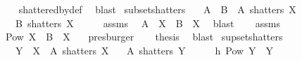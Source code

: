 \begin{isabellebody}
%
\isadelimproof
\ \ %
\endisadelimproof
%
\isatagproof
{}\isamarkupfalse%
\ shattered{\isacharunderscore}{\kern0pt}by{\isacharunderscore}{\kern0pt}def\ \isamarkupfalse%
\ blast%
\endisatagproof
{\isafoldproof}%
%
\isadelimproof
\isanewline
%
\endisadelimproof
\isanewline
{}\isamarkupfalse%
\ subset{\isacharunderscore}{\kern0pt}shatters{\isacharcolon}{\kern0pt}\isanewline
\ \ \ {\isachardoublequoteopen}A\ {\isasymsubseteq}\ B{\isachardoublequoteclose}\ \ {\isachardoublequoteopen}A\ shatters\ X{\isachardoublequoteclose}\isanewline
\ \ \ {\isachardoublequoteopen}B\ shatters\ X{\isachardoublequoteclose}\isanewline
%
\isadelimproof
%
\endisadelimproof
%
\isatagproof
{}\isamarkupfalse%
\ {\isacharminus}{\kern0pt}\isanewline
\ \ \isamarkupfalse%
\ assms{\isacharparenleft}{\kern0pt}{}{\isacharparenright}{\kern0pt}\ \isamarkupfalse%
\ {\isachardoublequoteopen}A\ {\isasyminter}{\isacharasterisk}{\kern0pt}\ X\ {\isasymsubseteq}\ B\ {\isasyminter}{\isacharasterisk}{\kern0pt}\ X{\isachardoublequoteclose}\ \isamarkupfalse%
\ blast\isanewline
\ \ \isamarkupfalse%
\ assms{\isacharparenleft}{\kern0pt}{}{\isacharparenright}{\kern0pt}\ \isamarkupfalse%
\ {\isachardoublequoteopen}Pow\ X\ {\isasymsubseteq}\ B\ {\isasyminter}{\isacharasterisk}{\kern0pt}\ X{\isachardoublequoteclose}\ \ \isamarkupfalse%
\ presburger\isanewline
\ \ \isamarkupfalse%
\ {\isacharquery}{\kern0pt}thesis\ \isamarkupfalse%
\ blast\isanewline
{}\isamarkupfalse%
%
\endisatagproof
{\isafoldproof}%
%
\isadelimproof
\isanewline
%
\endisadelimproof
\isanewline
{}\isamarkupfalse%
\ supset{\isacharunderscore}{\kern0pt}shatters{\isacharcolon}{\kern0pt}\isanewline
\ \ \ {\isachardoublequoteopen}Y\ {\isasymsubseteq}\ X{\isachardoublequoteclose}\ \ {\isachardoublequoteopen}A\ shatters\ X{\isachardoublequoteclose}\isanewline
\ \ \ {\isachardoublequoteopen}A\ shatters\ Y{\isachardoublequoteclose}\isanewline
%
\isadelimproof
%
\endisadelimproof
%
\isatagproof
{}\isamarkupfalse%
\ {\isacharminus}{\kern0pt}\isanewline
\ \ \isamarkupfalse%
\ h{\isacharcolon}{\kern0pt}\ {\isachardoublequoteopen}{\isasymUnion}{\isacharparenleft}{\kern0pt}Pow\ Y{\isacharparenright}{\kern0pt}\ {\isasymsubseteq}\ Y{\isachardoublequoteclose}\ \isamarkupfalse%

\end{isabellebody}
